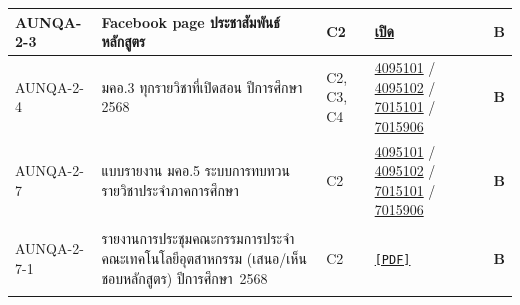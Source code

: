 \begin{longtable}{|>{\raggedright\arraybackslash}p{2.3cm}|>{\raggedright\arraybackslash}p{6.5cm}|>{\centering\arraybackslash}p{1.1cm}|>{\raggedright\arraybackslash}p{3.4cm}|>{\centering\arraybackslash}p{0.8cm}|}
  \hline
  \hypertarget{ref:AUNQA-2-3}{AUNQA-2-3} & Facebook page ประชาสัมพันธ์หลักสูตร & C2 & \href{https://www.facebook.com/CEAI.URU}{เปิด} & \textcolor{blue!70!black}{\textbf{B}} \\
  \hline
  \hypertarget{ref:AUNQA-2-4}{AUNQA-2-4} & มคอ.3 ทุกรายวิชาที่เปิดสอน ปีการศึกษา 2568 & C2, C3, C4 & \href{https://syweb.kidcbc.work/Eviden_aunqa68/\%E0\%B8\%A1\%E0\%B8\%84\%E0\%B8\%AD3/AUN3_4095101.pdf}{4095101} / \href{https://syweb.kidcbc.work/Eviden_aunqa68/\%E0\%B8\%A1\%E0\%B8\%84\%E0\%B8\%AD3/AUN3_4095102.pdf}{4095102} / \href{https://syweb.kidcbc.work/Eviden_aunqa68/\%E0\%B8\%A1\%E0\%B8\%84\%E0\%B8\%AD3/AUN3_7015101.pdf}{7015101} / \href{https://syweb.kidcbc.work/Eviden_aunqa68/\%E0\%B8\%A1\%E0\%B8\%84\%E0\%B8\%AD3/AUN3_7015906.pdf}{7015906} & \textcolor{blue!70!black}{\textbf{B}} \\
  \hline
  \hypertarget{ref:AUNQA-2-7}{AUNQA-2-7} & แบบรายงาน มคอ.5 ระบบการทบทวนรายวิชาประจำภาคการศึกษา & C2 & \href{https://syweb.kidcbc.work/Eviden_aunqa68/\%E0\%B8\%A1\%E0\%B8\%84\%E0\%B8\%AD5/AUN3_4095101.pdf}{4095101} / \href{https://syweb.kidcbc.work/Eviden_aunqa68/\%E0\%B8\%A1\%E0\%B8\%84\%E0\%B8\%AD5/AUN3_4095102.pdf}{4095102} / \href{https://syweb.kidcbc.work/Eviden_aunqa68/\%E0\%B8\%A1\%E0\%B8\%84\%E0\%B8\%AD5/AUN3_7015101.pdf}{7015101} / \href{https://syweb.kidcbc.work/Eviden_aunqa68/\%E0\%B8\%A1\%E0\%B8\%84\%E0\%B8\%AD5/AUN3_7015906.pdf}{7015906} & \textcolor{blue!70!black}{\textbf{B}} \\
  \hline
  \hypertarget{ref:AUNQA-2-7-1}{AUNQA-2-7-1} & รายงานการประชุมคณะกรรมการประจำคณะเทคโนโลยีอุตสาหกรรม (เสนอ/เห็นชอบหลักสูตร) ปีการศึกษา~2568 & C2 & \href{https://syweb.kidcbc.work/Eviden_aunqa68/\%E0\%B8\%AB\%E0\%B8\%A5\%E0\%B8\%B1\%E0\%B8\%81\%E0\%B8\%90\%E0\%B8\%B2\%E0\%B8\%99\%E0\%B8\%81\%E0\%B8\%B2\%E0\%B8\%A3\%E0\%B8\%9B\%E0\%B8\%A3\%E0\%B8\%B0\%E0\%B8\%8A\%E0\%B8\%B8\%E0\%B8\%A1/02_\%E0\%B8\%A3\%E0\%B8\%B0\%E0\%B8\%94\%E0\%B8\%B1\%E0\%B8\%9A\%E0\%B8\%84\%E0\%B8\%93\%E0\%B8\%B0/AUNQA-2-7-1_\%E0\%B8\%9B\%E0\%B8\%A3\%E0\%B8\%B0\%E0\%B8\%8A\%E0\%B8\%B8\%E0\%B8\%A1\%E0\%B8\%81\%E0\%B8\%A3\%E0\%B8\%A3\%E0\%B8\%A1\%E0\%B8\%81\%E0\%B8\%B2\%E0\%B8\%A3\%E0\%B8\%9B\%E0\%B8\%A3\%E0\%B8\%B0\%E0\%B8\%88\%E0\%B8\%B3\%E0\%B8\%84\%E0\%B8\%93\%E0\%B8\%B0_\%E0\%B9\%80\%E0\%B8\%AA\%E0\%B8\%99\%E0\%B8\%AD\%E0\%B8\%AB\%E0\%B8\%A5\%E0\%B8\%B1\%E0\%B8\%81\%E0\%B8\%AA\%E0\%B8\%B9\%E0\%B8\%95\%E0\%B8\%A3_2568.pdf}{\texttt{[PDF]}} & \textcolor{blue!70!black}{\textbf{B}} \\
  \hline

\end{longtable}
